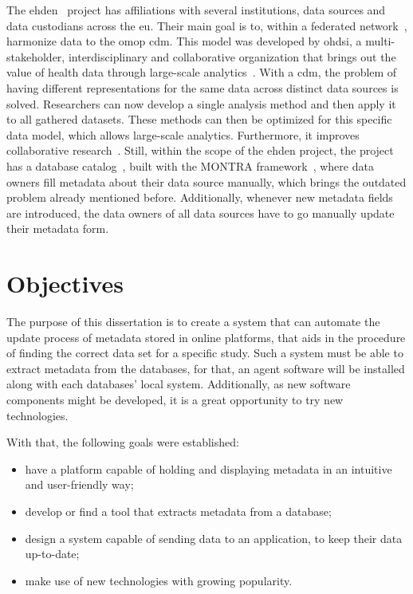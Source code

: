 The \gls{ehden}~\cite{ehden} project has affiliations with several institutions, data sources and data custodians across the \gls{eu}.
Their main goal is to, within a federated network~\cite{ehden-datapartners}, harmonize data to the \gls{omop} \gls{cdm}.
This model was developed by \gls{ohdsi}, a multi-stakeholder, interdisciplinary and collaborative organization that brings out the value of health data through large-scale analytics~\cite{ohdsi-site}.
With a \gls{cdm}, the problem of having different representations for the same data across distinct data sources is solved.
Researchers can now develop a single analysis method and then apply it to all gathered datasets.
These methods can then be optimized for this specific data model, which allows large-scale analytics.
Furthermore, it improves collaborative research~\cite{ohdsi-site}.
Still, within the scope of the \gls{ehden} project, the project has a database catalog~\cite{ehden-portal}, built with the MONTRA framework~\cite{montra}, where data owners fill metadata about their data source manually, which brings the outdated problem already mentioned before.
Additionally, whenever new metadata fields are introduced, the data owners of all data sources have to go manually update their metadata form.

\section{Objectives}
The purpose of this dissertation is to create a system that can automate the update process of metadata stored in online platforms, that aids in the procedure of finding the correct data set for a specific study.
Such a system must be able to extract metadata from the databases, for that, an agent software will be installed along with each databases' local system.
Additionally, as new software components might be developed, it is a great opportunity to try new technologies.

With that, the following goals were established:
\begin{itemize}
    \item have a platform capable of holding and displaying metadata in an intuitive and user-friendly way;
    \item develop or find a tool that extracts metadata from a database;
    \item design a system capable of sending data to an application, to keep their data up-to-date;
    \item make use of new technologies with growing popularity.
\end{itemize}

